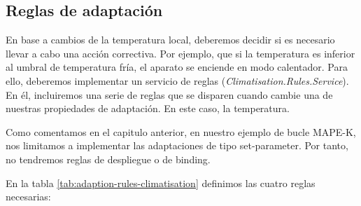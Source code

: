 \subsection{Reglas de adaptación}
\label{sec:caso-estudio-diseño-reglas}

En base a cambios de la temperatura local, deberemos decidir si es necesario llevar a cabo una acción correctiva. Por ejemplo, que si la temperatura es inferior al umbral de temperatura fría, el aparato se enciende en modo calentador. Para ello, deberemos implementar un servicio de reglas (\emph{Climatisation.Rules.Service}). En él, incluiremos una serie de reglas que se disparen cuando cambie una de nuestras propiedades de adaptación. En este caso, la temperatura.

Como comentamos en el capitulo anterior, en nuestro ejemplo de bucle MAPE-K, nos limitamos a implementar las adaptaciones de tipo set-parameter. Por tanto, no tendremos reglas de despliegue o de binding.

En la tabla \ref{tab:adaption-rules-climatisation} definimos las cuatro reglas necesarias:

